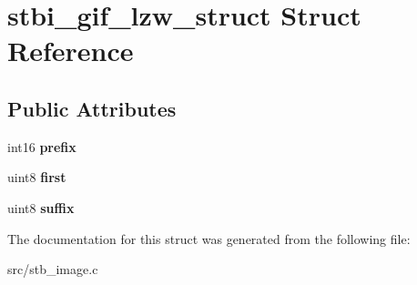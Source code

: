 \hypertarget{structstbi__gif__lzw__struct}{}\section{stbi\+\_\+gif\+\_\+lzw\+\_\+struct Struct Reference}
\label{structstbi__gif__lzw__struct}
\subsection*{Public Attributes}
\begin{DoxyCompactItemize}
\item 
\hypertarget{structstbi__gif__lzw__struct_a0e5142cb4117b905eb9efd73c436525c}{}int16 {\bfseries prefix}\label{structstbi__gif__lzw__struct_a0e5142cb4117b905eb9efd73c436525c}

\item 
\hypertarget{structstbi__gif__lzw__struct_a08129c445d56c0983285d6e0e71b83bd}{}uint8 {\bfseries first}\label{structstbi__gif__lzw__struct_a08129c445d56c0983285d6e0e71b83bd}

\item 
\hypertarget{structstbi__gif__lzw__struct_a3ec7f462268018489345b79b2f123764}{}uint8 {\bfseries suffix}\label{structstbi__gif__lzw__struct_a3ec7f462268018489345b79b2f123764}

\end{DoxyCompactItemize}


The documentation for this struct was generated from the following file\+:\begin{DoxyCompactItemize}
\item 
src/stb\+\_\+image.\+c\end{DoxyCompactItemize}
